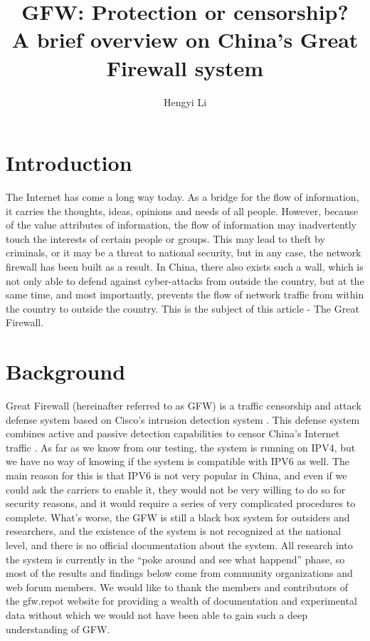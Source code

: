 \documentclass[11pt]{article}
\title{GFW: Protection or censorship?\\ \large A brief overview on China's Great Firewall system}
\author{Hengyi Li}
\begin{document}
\maketitle

\section{Introduction}

The Internet has come a long way today. As a bridge for the flow of information,
it carries the thoughts, ideas, opinions and needs of all people. However,
because of the value attributes of information, the flow of information may
inadvertently touch the interests of certain people or groups. This may lead to
theft by criminals, or it may be a threat to national security, but in any case,
the network firewall has been built as a result. In China, there also exists
such a wall, which is not only able to defend against cyber-attacks from outside
the country, but at the same time, and most importantly, prevents the flow of
network traffic from within the country to outside the country. This is the
subject of this article - The Great Firewall.

\section{Background}
Great Firewall (hereinafter referred to as GFW) is a traffic censorship and
attack defense system based on Cisco's intrusion detection system \cite{CISCO}.
This defense system combines active and passive detection capabilities to censor
China's Internet traffic \cite{DetectBlockShadowSocks}.
As far as we know from our testing, the system is running on IPV4, but we have no way of knowing if the system is compatible with
IPV6 as well. The main reason for this is that IPV6 is not very popular in China,
and even if we could ask the carriers to enable it, they would not be very
willing to do so for security reasons, and it would require a series of very
complicated procedures to complete. What's worse, the GFW is still a black box
system for outsiders and researchers, and the existence of the system is not
recognized at the national level, and there is no official documentation about
the system. All research into the system is currently in the ``poke around and
see what happend'' phase, so most of the results and findings below come from
community organizations and web forum members. We would like to thank the
members and contributors of the gfw.repot \cite{GFWReport} website for providing a wealth of
documentation and experimental data without which we would not have been able to
gain such a deep understanding of GFW.
\end{document}
